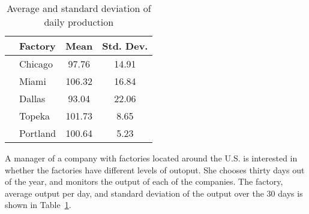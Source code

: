 \documentclass[11pt]{exam}
\begin{document}
\begin{questions}



%

\begin{table}[ht]
\begin{center}
\begin{tabular}{|llcc|}
  \hline
  & Factory & Mean & Std. Dev. \\ 
  \hline
  & Chicago &
97.76&
14.91\\
& Miami &
106.32&
16.84\\
& Dallas &
93.04&
22.06\\
& Topeka &
101.73&
8.65\\
& Portland &
100.64&
5.23\\
\hline
\end{tabular}
\caption{Average and standard deviation of daily production}
\label{tab:widget}
\end{center}
\end{table}


\question A manager of a company with factories located around the U.S. is
interested in whether the factories have different levels of outoput.  She
chooses thirty days out of the year, and monitors the output of each of the
companies. The factory, average output per day, and standard deviation of
the output over the 30 days is shown in Table~\ref{tab:widget}.


\end{questions}
\end{document}
